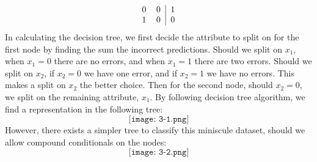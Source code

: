 \documentclass{article}
\begin{document}
\begin{enumerate}
$$\begin{tabular}{c c | c}
                0 & 0 & 1 \\
                1 & 0 & 0   %
            \end{tabular} $$
            In calculating the decision tree, we first decide the attribute to split
            on for the first node by finding the sum the incorrect predictions. Should we split
            on $x_1$, when $x_1 = 0$ there are no errors, and when $x_1 = 1$ there are
            two errors. Should we split on $x_2$, if $x_2 = 0$ we have one error, and
            if $x_2 = 1$ we have no errors. This makes a split on $x_2$ the better choice.
            Then for the second node, should $x_2 = 0$, we split on the remaining attribute,
            $x_1$. By following decision tree algorithm, we find a representation in the
            following tree:
            $$ \texttt{[image: 3-1.png]} $$
            However, there exists a simpler tree to classify this miniscule dataset,
            should we allow compound conditionals on the nodes:
            $$ \texttt{[image: 3-2.png]} $$
\end{enumerate}
\end{document}
